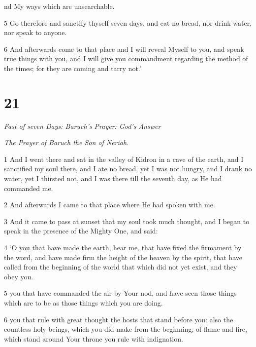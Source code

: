 \par nd My ways which are unsearchable.

\par 5 Go therefore and sanctify thyself seven days, and eat no bread, nor drink water, nor speak to anyone.

\par 6 And afterwards come to that place and I will reveal Myself to you, and speak true things with you, and I will give you commandment regarding the method of the times; for they are coming and tarry not.’

\chapter{21}

\par \textit{Fast of seven Days: Baruch's Prayer: God's Answer}

\par \textit{The Prayer of Baruch the Son of Neriah.}

\par 1 And I went there and sat in the valley of Kidron in a cave of the earth, and I sanctified my soul there, and I ate no bread, yet I was not hungry, and I drank no water, yet I thirsted not, and I was there till the seventh day, as He had commanded me. 

\par 2 And afterwards I came to that place where He had spoken with me. 

\par 3 And it came to pass at sunset that my soul took much thought, and I began to speak in the presence of the Mighty One, and said: 

\par 4 ‘O you that have made the earth, hear me, that have fixed the firmament by the word, and have made firm the height of the heaven by the spirit, that have called from the beginning of the world that which did not yet exist, and they obey you. 

\par 5 you that have commanded the air by Your nod, and have seen those things which are to be as those things which you are doing. 

\par 6 you that rule with great thought the hosts that stand before you: also the countless holy beings, which you did make from the beginning, of flame and fire, which stand around Your throne you rule with indignation. 

